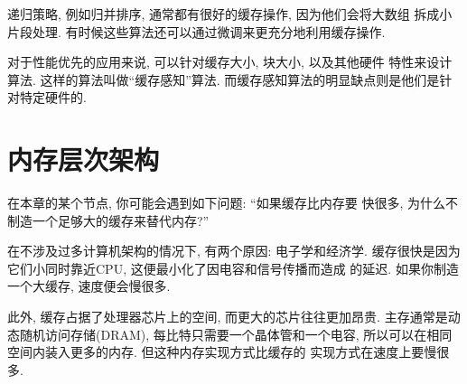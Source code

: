 \documentclass[12pt]{book}
\begin{document}
{%
递归策略, 例如归并排序, 通常都有很好的缓存操作, 因为他们会将大数组
拆成小片段处理. 有时候这些算法还可以通过微调来更充分地利用缓存操作.

对于性能优先的应用来说, 可以针对缓存大小, 块大小, 以及其他硬件
特性来设计算法. 这样的算法叫做``缓存感知''算法. 
而缓存感知算法的明显缺点则是他们是针对特定硬件的.

\section{内存层次架构}

在本章的某个节点, 你可能会遇到如下问题: ``如果缓存比内存要
快很多, 为什么不制造一个足够大的缓存来替代内存?''

在不涉及过多计算机架构的情况下, 有两个原因: 电子学和经济学. 
缓存很快是因为它们小同时靠近CPU, 这便最小化了因电容和信号传播而造成
的延迟. 如果你制造一个大缓存, 速度便会慢很多.

此外, 缓存占据了处理器芯片上的空间, 而更大的芯片往往更加昂贵.
主存通常是动态随机访问存储(DRAM), 每比特只需要一个晶体管和一个电容, 
所以可以在相同空间内装入更多的内存. 但这种内存实现方式比缓存的
实现方式在速度上要慢很多.

}
\end{document}
